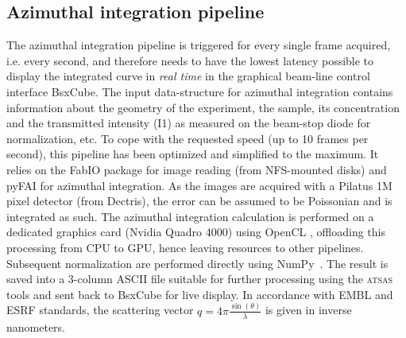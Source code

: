 \documentclass[preprint,pdf]{iucr}              %
\begin{document}
\subsection{Azimuthal integration pipeline}
\label{AI}
The azimuthal integration pipeline is triggered for every single frame acquired, i.e. every second,
and therefore needs to have the lowest latency possible to display the integrated curve
in \textit{real time} in the graphical beam-line control interface BsxCube.
The input data-structure for azimuthal integration contains
information about the geometry of the experiment, the sample, its concentration
and the transmitted intensity (I1) as measured on the beam-stop diode for
normalization, etc.
To cope with the requested speed (up to 10 frames per second), this pipeline
has been optimized and simplified to the maximum.
It relies on the FabIO\cite{fabio} package for image reading (from NFS-mounted
disks) and pyFAI\cite{pyFAI} for azimuthal integration.
As the images are acquired with a Pilatus 1M pixel detector (from Dectris), the
error can be assumed to be Poissonian and is integrated as such.
The azimuthal integration calculation is performed on a dedicated graphics card
(Nvidia Quadro 4000) using OpenCL \cite{pyFAI_gpu}, offloading this processing
from CPU to GPU, hence leaving resources to other pipelines.
Subsequent normalization are performed directly using NumPy~\cite{numpy}.
The result is saved into a 3-column ASCII file suitable for further processing
using the \textsc{atsas} tools\cite{ATSAS2} and sent back to BsxCube for
live display.
In accordance with EMBL and ESRF standards, the scattering vector
$q=4\pi\frac{\sin(\theta)}{\lambda}$ is given in inverse nanometers.
\end{document}

